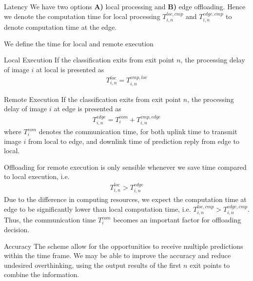 	\begin{enumdescript}
		\item[Latency]  We have two options \textbf{A)} local processing and \textbf{B)} edge offloading. Hence we denote the computation time for local processing $ T_{i,n}^{loc,cmp} $ and $ T_{i,n}^{edge,cmp} $ to denote computation time at the edge. 
	
		We define the time for local and remote execution

		\begin{enumdescript}
			\item[Local Execution] If the classification exits from exit point $ n $, the processing delay of image $ i $ at local is presented as
			\begin{align}
			T_{i,n}^{loc}= T_{i,n}^{cmp,loc}
			\end{align}
			\item[Remote Execution] If the classification exits from exit point $ n $, the processing delay of image $ i $ at edge is presented as
			\begin{align}
			T_{i,n}^{edge}=T_{i}^{com}+ T_{i,n}^{cmp,edge}
			\end{align}
			where $ T^{com}_i $ denotes the communication time, for both uplink time to transmit image $ i $ from local to edge, and downlink time of prediction reply from edge to local.
			
			Offloading for remote execution is only sensible whenever we save time compared to local execution, i.e.
			\begin{align*}
					T_{i,n}^{loc} > T_{i,n}^{edge}
			\end{align*}
			Due to the difference in computing resources, we expect the computation time at edge to be significantly lower than local computation time, i.e. $ T_{i,n}^{loc,cmp} > T_{i,n}^{edge,cmp} $. Thus, the communication time $ T^{com}_i $ becomes an important factor for offloading decision.

		\end{enumdescript}
	
		\item[Accuracy] The scheme allow for the opportunities to receive multiple predictions within the time frame. We may be able to improve the accuracy and reduce undesired overthinking, using the output results of the first $ n $ exit points to combine the information.
		

\end{enumdescript}
